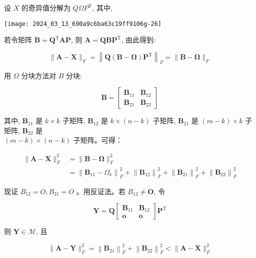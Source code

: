 \documentclass[10pt]{article}
\begin{document}
设 $X$ 的奇异值分解为 $Q \Omega P^{\mathrm{T}}$, 其中,

\begin{center}
\texttt{[image: 2024\_03\_13\_690a9c6ba63c19ff9106g-26]}
\end{center}

若令矩阵 $\boldsymbol{B}=\boldsymbol{Q}^{\mathrm{T}} \boldsymbol{A P}$, 则 $\boldsymbol{A}=\boldsymbol{Q B} \boldsymbol{P}^{\mathrm{T}}$, 由此得到:


\begin{equation*}
\|\boldsymbol{A}-\boldsymbol{X}\|_{F}=\left\|\boldsymbol{Q}(\boldsymbol{B}-\boldsymbol{\Omega}) \boldsymbol{P}^{\mathrm{T}}\right\|_{F}=\|\boldsymbol{B}-\boldsymbol{\Omega}\|_{F} \tag{15.36}
\end{equation*}


用 $\Omega$ 分块方法对 $B$ 分块:

$$
\boldsymbol{B}=\left[\begin{array}{ll}
\boldsymbol{B}_{11} & \boldsymbol{B}_{12} \\
\boldsymbol{B}_{21} & \boldsymbol{B}_{22}
\end{array}\right]
$$

其中, $\boldsymbol{B}_{11}$ 是 $k \times k$ 子矩阵, $\boldsymbol{B}_{12}$ 是 $k \times(n-k)$ 子矩阵, $\boldsymbol{B}_{21}$ 是 $(m-k) \times k$ 子矩阵, $\boldsymbol{B}_{22}$ 是\\
$(m-k) \times(n-k)$ 子矩阵。可得：


\begin{align*}
\|\boldsymbol{A}-\boldsymbol{X}\|_{F}^{2} & =\|\boldsymbol{B}-\boldsymbol{\Omega}\|_{F}^{2} \\
& =\left\|\boldsymbol{B}_{11}-\Omega_{k}\right\|_{F}^{2}+\left\|\boldsymbol{B}_{12}\right\|_{F}^{2}+\left\|\boldsymbol{B}_{21}\right\|_{F}^{2}+\left\|\boldsymbol{B}_{22}\right\|_{F}^{2} \tag{15.37}
\end{align*}


现证 $B_{12}=O, B_{21}=O$ 。用反证法。若 $B_{12} \neq \boldsymbol{O}$, 令

$$
\boldsymbol{Y}=\boldsymbol{Q}\left[\begin{array}{cc}
\boldsymbol{B}_{11} & \boldsymbol{B}_{12} \\
\boldsymbol{o} & \boldsymbol{o}
\end{array}\right] \boldsymbol{P}^{\mathrm{T}}
$$

则 $\boldsymbol{Y} \in \mathcal{M}$, 且


\begin{equation*}
\|\boldsymbol{A}-\boldsymbol{Y}\|_{F}^{2}=\left\|\boldsymbol{B}_{21}\right\|_{F}^{2}+\left\|\boldsymbol{B}_{22}\right\|_{F}^{2}<\|\boldsymbol{A}-\boldsymbol{X}\|_{F}^{2} \tag{15.38}
\end{equation*}
\end{document}
